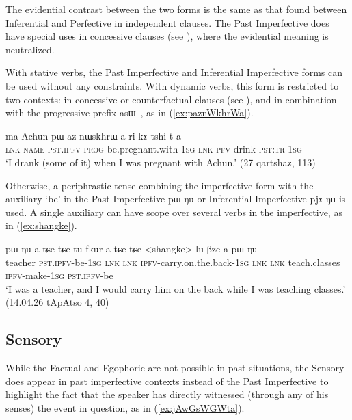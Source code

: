 \documentclass[oldfontcommands,oneside,a4paper,11pt]{article}
\newcommand{\ipa}[1]{{\phon \mbox{#1}}} %
\newcommand{\refb}[1]{(\ref{#1})}
\begin{document}
The evidential contrast between the two forms is the same as that found between Inferential and Perfective in independent clauses. The Past Imperfective does have special uses in concessive clauses (see \citealt[298]{jacques14linking}), where the evidential meaning is neutralized.

With stative verbs, the Past Imperfective and Inferential Imperfective forms can be used without any constraints. With dynamic verbs, this form is restricted to two contexts: in concessive or counterfactual clauses (see \citealt[298]{jacques14linking}), and in combination with the progressive prefix \ipa{asɯ--}, as in \refb{ex:paznWkhrWa}.

\begin{exe}
\ex \label{ex:paznWkhrWa}
\gll 
\ipa{ma} 	Achun 	\ipa{pɯ-az-nɯskhrɯ-a} 	\ipa{ri} 	\ipa{kɤ-tshi-t-a} \\
\textsc{lnk} \textsc{name} \textsc{pst.ipfv-prog}-be.pregnant.with-\textsc{1sg} \textsc{lnk} \textsc{pfv}-drink-\textsc{pst:tr-1sg} \\
\glt `I drank (some of it) when I was pregnant with Achun.' (27 qartshaz, 113)
\end{exe}

Otherwise, a periphrastic tense combining the imperfective form with the auxiliary `be' in the Past Imperfective \ipa{pɯ-ŋu} or Inferential Imperfective \ipa{pjɤ-ŋu}  is used.   A single auxiliary  can have scope over several verbs in the imperfective, as in \refb{ex:shangke}.

\begin{exe}
\ex \label{ex:shangke}
\gll  \ipa{sloχpɯn} 	\ipa{pɯ-ŋu-a} 	\ipa{tɕe} 	\ipa{tɕe} 	\ipa{tu-fkur-a} 	\ipa{tɕe} 	\ipa{tɕe} 	 <shangke> 	\ipa{lu-βze-a} 	\ipa{pɯ-ŋu} \\
teacher \textsc{pst.ipfv}-be-\textsc{1sg} \textsc{lnk}  \textsc{lnk} \textsc{ipfv}-carry.on.the.back-\textsc{1sg} \textsc{lnk}  \textsc{lnk}  teach.classes \textsc{ipfv}-make-\textsc{1sg} \textsc{pst.ipfv}-be \\
\glt `I was a teacher, and I would carry him on the back while I was teaching classes.' (14.04.26 tApAtso 4, 40)
\end{exe}


\subsection{Sensory}  \label{sec:pst:sens}
While the Factual and Egophoric are not possible in past situations, the Sensory does appear in past imperfective contexts instead of the Past Imperfective to highlight the fact that the speaker  has directly witnessed (through any of his senses) the event in question, as in \refb{ex:jAwGsWGWta}. 
\end{document}
